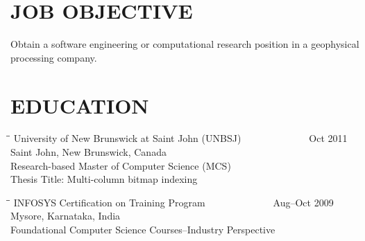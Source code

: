 \documentclass{res}
\begin{document}
 


                                  
\begin{resume}

\section{JOB OBJECTIVE}          
   \vspace{0.05 in}
Obtain a software engineering or computational research position in a geophysical processing company.
\section{EDUCATION}
   \vspace{0.05 in}
   
   \begin{tabbing}
   \hspace{2.3in}\= \hspace{2.6in}\= \kill %
        University of New Brunswick at Saint John (UNBSJ)\> ~~~~~~ \> ~~~~~~ Oct 2011\\
        Saint John, New Brunswick, Canada\\
        Research-based Master of Computer Science (MCS)\\
        Thesis Title: Multi-column bitmap indexing\\
   \end{tabbing}\vspace{-20pt}      %
   
   \begin{tabbing}
   \hspace{2.3in}\= \hspace{2.6in}\= \kill %
        INFOSYS Certification on Training Program\> ~~~~~~ \> ~~~~~~ Aug--Oct 2009\\
        Mysore, Karnataka, India\\
        Foundational Computer Science Courses--Industry Perspective\\
   \end{tabbing}\vspace{-20pt}      %


\end{resume}
\end{document}
